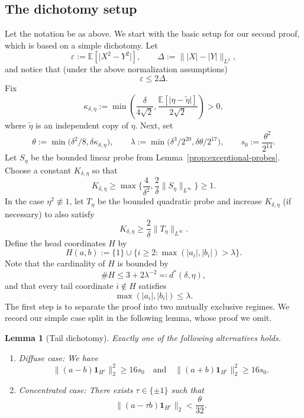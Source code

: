 \documentclass[11pt]{amsart}
\numberwithin{equation}{section}
\newtheorem{lemma}[theorem]{Lemma}
\theoremstyle{definition}
\theoremstyle{remark}
\newcommand{\E}{\mathbb E}
\newcommand{\eps}{\varepsilon}
\newcommand{\abs}[1]{\lvert #1 \rvert}
\newcommand{\norm}[1]{\lVert #1 \rVert}
\begin{document}
\subsection{The dichotomy setup}
Let the notation be as above. We start with the basic setup for our second proof, which is based on a simple dichotomy. Let
\[
\eps:=\E[\abs{X^2-Y^2}],
\qquad
\Delta:=\norm{|X|-|Y|}_{L^2},
\]
and notice that (under the above normalization assumptions)
\[
\eps\le 2\Delta.
\]
Fix
\[
\kappa_{\delta,\eta}
:=
\min\left(
\frac{\delta}{4\sqrt2},
\frac{\E[\abs{\eta-\widetilde\eta}]}{2\sqrt2}
\right)>0,
\]
where $\widetilde\eta$ is an independent copy of $\eta$.  Next, set
\[
\theta:=\min\bigl(\delta^2/8,\delta\kappa_{\delta,\eta}\bigr),
\qquad
\lambda:=\min\bigl(\delta^3/2^{20},\delta\theta/2^{17}\bigr),
\qquad
s_0:=\frac{\theta^2}{2^{14}}.
\]
Let $S_\eta$ be the bounded linear probe from
Lemma~\ref{prop:exceptional-probes}. Choose a
constant $K_{\delta,\eta}$ so that
\[
K_{\delta,\eta}\ge \max\bigg\{\frac{4}{\delta^2},\frac{2}{\delta
}\norm{S_\eta}_{L^\infty}\bigg\} \ge 1.
\]
 In the case $\eta^2\not\equiv1$, let
$T_\eta$ be the bounded quadratic probe and increase $K_{\delta,\eta}$ (if necessary) to also satisfy
\[
K_{\delta,\eta}\ge \frac{2}{\delta} \norm{T_\eta}_{L^\infty}.
\]
Define the head coordinates $H$ by
\[
H(a,b):=\{1\}\cup\{i\ge2:\max(|a_i|,|b_i|)>\lambda\}.
\]
Note that the cardinality of $H$ is bounded by
\[
\#H\le 3+2\lambda^{-2} \eqqcolon d^{\ast}(\delta,\eta),
\]
and that every tail coordinate $i\notin H$ satisfies
\[
\max(|a_i|,|b_i|)\le \lambda.
\]
The first step is to separate the proof into two mutually exclusive regimes.
We record our simple case split in the following lemma, whose proof we omit. 
\begin{lemma}[Tail dichotomy]\label{lem:dichotomy}
Exactly one of the following alternatives holds.
\begin{enumerate}[label=\rm(\roman*)]
\item \textit{Diffuse case:} We have
\[
\norm{(a-b)\mathbf 1_{H^c}}_2^2\ge16s_0
\quad\text{and}\quad
\norm{(a+b)\mathbf 1_{H^c}}_2^2\ge16s_0.
\]
\item \textit{Concentrated case:} There exists $\tau\in\{\pm1\}$ such that
\[
\norm{(a-\tau b)\mathbf 1_{H^c}}_2<\frac{\theta}{32}.
\]
\end{enumerate}
\end{lemma}
\end{document}
